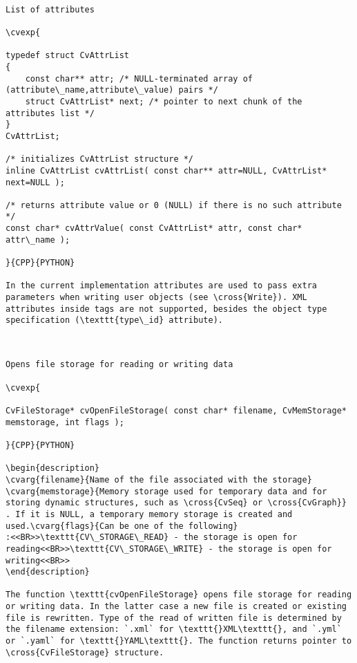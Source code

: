 \label{CvAttrList}
\begin{verbatim}

List of attributes

\cvexp{

typedef struct CvAttrList
{
    const char** attr; /* NULL-terminated array of (attribute\_name,attribute\_value) pairs */
    struct CvAttrList* next; /* pointer to next chunk of the attributes list */
}
CvAttrList;

/* initializes CvAttrList structure */
inline CvAttrList cvAttrList( const char** attr=NULL, CvAttrList* next=NULL );

/* returns attribute value or 0 (NULL) if there is no such attribute */
const char* cvAttrValue( const CvAttrList* attr, const char* attr\_name );

}{CPP}{PYTHON}

In the current implementation attributes are used to pass extra parameters when writing user objects (see \cross{Write}). XML attributes inside tags are not supported, besides the object type specification (\texttt{type\_id} attribute).


\end{verbatim}
\label{OpenFileStorage}
\begin{verbatim}

Opens file storage for reading or writing data

\cvexp{

CvFileStorage* cvOpenFileStorage( const char* filename, CvMemStorage* memstorage, int flags );

}{CPP}{PYTHON}

\begin{description}
\cvarg{filename}{Name of the file associated with the storage}
\cvarg{memstorage}{Memory storage used for temporary data and for storing dynamic structures, such as \cross{CvSeq} or \cross{CvGraph}}
. If it is NULL, a temporary memory storage is created and used.\cvarg{flags}{Can be one of the following}
:<<BR>>\texttt{CV\_STORAGE\_READ} - the storage is open for reading<<BR>>\texttt{CV\_STORAGE\_WRITE} - the storage is open for writing<<BR>>
\end{description}

The function \texttt{cvOpenFileStorage} opens file storage for reading or writing data. In the latter case a new file is created or existing file is rewritten. Type of the read of written file is determined by the filename extension: `.xml` for \texttt{}XML\texttt{}, and `.yml` or `.yaml` for \texttt{}YAML\texttt{}. The function returns pointer to \cross{CvFileStorage} structure.


\end{verbatim}
